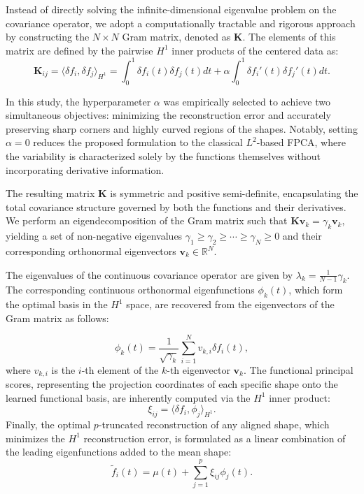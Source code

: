 \documentclass[twoside]{article}
\begin{document}
Instead of directly solving the infinite-dimensional eigenvalue problem on the covariance operator, we adopt a computationally tractable and rigorous approach by constructing the $N \times N$ Gram matrix, denoted as $\mathbf{K}$. The elements of this matrix are defined by the pairwise $H^1$ inner products of the centered data as:
\begin{equation*}
\label{eq:gram_matrix}
\mathbf{K}_{ij} = \langle \delta f_i, \delta f_j \rangle_{H^1} = \int_{0}^{1} \delta f_i(t) \delta f_j(t) dt + \alpha \int_{0}^{1} \delta f_i'(t) \delta f_j'(t) dt.
\end{equation*}

In this study, the hyperparameter $\alpha$ was empirically selected to achieve two simultaneous objectives: minimizing the reconstruction error and accurately preserving sharp corners and highly curved regions of the shapes. Notably, setting $\alpha = 0$ reduces the proposed formulation to the classical $L^2$-based FPCA, where the variability is characterized solely by the functions themselves without incorporating derivative information.

The resulting matrix $\mathbf{K}$ is symmetric and positive semi-definite, encapsulating the total covariance structure governed by both the functions and their derivatives. We perform an eigendecomposition of the Gram matrix such that 
$
\mathbf{K}\mathbf{v}_k = \gamma_k \mathbf{v}_k,
$
yielding a set of non-negative eigenvalues 
$
\gamma_1 \ge \gamma_2 \ge \cdots \ge \gamma_N \ge 0
$
and their corresponding orthonormal eigenvectors $\mathbf{v}_k \in \mathbb{R}^N$.


The eigenvalues of the continuous covariance operator are given by
$
\lambda_k = \frac{1}{N-1}\gamma_k.
$
The corresponding continuous orthonormal eigenfunctions $\phi_k(t)$, which form the optimal basis in the $H^1$ space, are recovered from the eigenvectors of the Gram matrix as follows:

\begin{equation*}
\label{eq:eigenfunctions}
\phi_k(t) = \frac{1}{\sqrt{\gamma_k}} \sum_{i=1}^N v_{k,i} \delta f_i(t),
\end{equation*}
where $v_{k,i}$ is the $i$-th element of the $k$-th eigenvector $\mathbf{v}_k$. The functional principal scores, representing the projection coordinates of each specific shape onto the learned functional basis, are inherently computed via the $H^1$ inner product:
\begin{equation*}
\label{eq:fpca_scores}
\xi_{ij} = \langle \delta f_i, \phi_j \rangle_{H^1}.
\end{equation*}
Finally, the optimal $p$-truncated reconstruction of any aligned shape, which minimizes the $H^1$ reconstruction error, is formulated as a linear combination of the leading eigenfunctions added to the mean shape:
\begin{equation*}
\label{eq:reconstruction}
\tilde{f}_i(t) = \mu(t) + \sum_{j=1}^p \xi_{ij} \phi_j(t).
\end{equation*}
\end{document}
